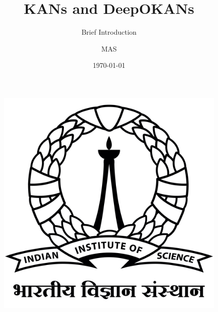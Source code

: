 \documentclass[serif, aspectratio=169]{beamer}
\author{MAS}
\title{KANs and DeepOKANs}
\subtitle{Brief Introduction}
\institute{
    \\
    IISc, Bengaluru\\
}
\date{\small \today}
\begin{document}
\begin{frame}
    \titlepage
    \vspace*{-0.6cm}
    \begin{figure}[htpb]
        \begin{center}
            \includegraphics[keepaspectratio, scale=0.02]{unilogo.png}
        \end{center}
    \end{figure}
\end{frame}

\begin{frame}
    \tableofcontents[sectionstyle=show,
        subsectionstyle=show/shaded/hide,
        subsubsectionstyle=show/shaded/hide]
\end{frame}

\end{document}
